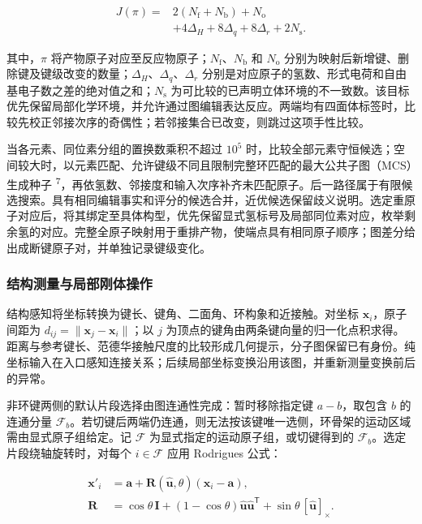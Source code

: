 \begin{equation}\label{eq:methods-1}
\begin{aligned}
J(\pi)={}&2(N_{\mathrm f}+N_{\mathrm b})+N_{\mathrm o}\\
&+4\Delta_H+8\Delta_q+8\Delta_r+2N_{\mathrm s}.
\end{aligned}
\end{equation}

其中，$\pi$ 将产物原子对应至反应物原子；$N_{\mathrm f}$、$N_{\mathrm b}$ 和 $N_{\mathrm o}$ 分别为映射后新增键、删除键及键级改变的数量；$\Delta_H$、$\Delta_q$、$\Delta_r$ 分别是对应原子的氢数、形式电荷和自由基电子数之差的绝对值之和；$N_{\mathrm s}$ 为可比较的已声明立体环境的不一致数。该目标优先保留局部化学环境，并允许通过图编辑表达反应。两端均有四面体标签时，比较先校正邻接次序的奇偶性；若邻接集合已改变，则跳过这项手性比较。

当各元素、同位素分组的置换数乘积不超过 $10^5$ 时，比较全部元素守恒候选；空间较大时，以元素匹配、允许键级不同且限制完整环匹配的最大公共子图（MCS）生成种子 \textsuperscript{7}，再依氢数、邻接度和输入次序补齐未匹配原子。后一路径属于有限候选搜索。具有相同编辑事实和评分的候选合并，近优候选保留歧义说明。选定重原子对应后，将其绑定至具体构型，优先保留显式氢标号及局部同位素对应，枚举剩余氢的对应。完整全原子映射用于重排产物，使端点具有相同原子顺序；图差分给出成断键原子对，并单独记录键级变化。

\subsubsection{结构测量与局部刚体操作}

结构感知将坐标转换为键长、键角、二面角、环构象和近接触。对坐标 $\mathbf x_i$，原子间距为 $d_{ij}=\|\mathbf x_j-\mathbf x_i\|$；以 $j$ 为顶点的键角由两条键向量的归一化点积求得。距离与参考键长、范德华接触尺度的比较形成几何提示，分子图保留已有身份。纯坐标输入在入口感知连接关系；后续局部坐标变换沿用该图，并重新测量变换前后的异常。

非环键两侧的默认片段选择由图连通性完成：暂时移除指定键 $a-b$，取包含 $b$ 的连通分量 $\mathcal F_b$。若切键后两端仍连通，则无法按该键唯一选侧，环骨架的运动区域需由显式原子组给定。记 $\mathcal F$ 为显式指定的运动原子组，或切键得到的 $\mathcal F_b$。选定片段绕轴旋转时，对每个 $i\in\mathcal F$ 应用 Rodrigues 公式：

\begin{equation}\label{eq:methods-2}
\begin{aligned}
\mathbf x'_i&=\mathbf a+\mathbf R(\hat{\mathbf u},\theta)(\mathbf x_i-\mathbf a),\\
\mathbf R&=\cos\theta\,\mathbf I+(1-\cos\theta)\hat{\mathbf u}\hat{\mathbf u}^{\mathsf T}
+\sin\theta\,[\hat{\mathbf u}]_\times .
\end{aligned}
\end{equation}

